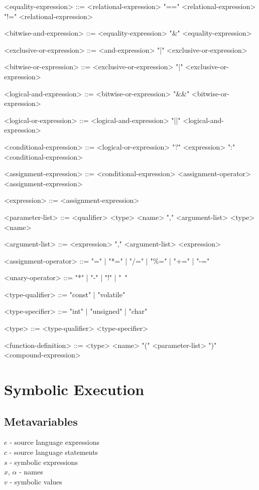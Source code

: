 \documentclass{article}
\begin{document}
\begin{grammar}
<equality-expression> ::= <relational-expression>
   "==" <relational-expression>
   "!=" <relational-expression>

<bitwise-and-expression> ::= <equality-expression>
   "&" <equality-expression>

<exclusive-or-expression> ::= <and-expression>
   "|" <exclusive-or-expression>

<bitwise-or-expression> ::= <exclusive-or-expression>
   "|" <exclusive-or-expression>

<logical-and-expression> ::= <bitwise-or-expression>
   "&&" <bitwise-or-expression>

<logical-or-expression> ::= <logical-and-expression>
   "||" <logical-and-expression>

<conditional-expression> ::= <logical-or-expression>
   "?" <expression> ":" <conditional-expression>

<assignment-expression> ::= <conditional-expression>
   <assignment-operator> <assignment-expression>

<expression> ::= <assignment-expression>

<parameter-list> ::= <qualifier> <type> <name> "," <argument-list>
   <type> <name>

<argument-list> ::= <expression> "," <argument-list>
  \alt <expression>

<assignment-operator> ::= "=" | "*=" | "/=" | "\%=" | "+=" | "-="

<unary-operator> ::= "*" | "-" | "!" | "~"

<type-qualifier> ::= "const" | "volatile"

<type-specifier> ::= "int" | "unsigned" | "char" %

<type> ::= <type-qualifier> <type-specifier>

<function-definition> ::= <type> <name> "(" <parameter-list> ")" <compound-expression>

\end{grammar}

\section{Symbolic Execution}

\subsection{Metavariables}
$e$ - source language expressions\\
$c$ - source language statements\\
$s$ - symbolic expressions\\
$x$, $\alpha$ - names\\
$v$ - symbolic values\\
\end{document}
